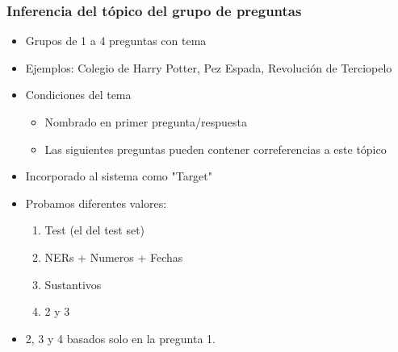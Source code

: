 \begin{frame}
\frametitle{Inferencia del tópico del grupo de preguntas}
  \begin{itemize}
    \item Grupos de 1 a 4 preguntas con tema
    \item Ejemplos: Colegio de Harry Potter, Pez Espada, Revolución de Terciopelo
    \item Condiciones del tema
    \begin{itemize}
      \item Nombrado en primer pregunta/respuesta
      \item Las siguientes preguntas pueden contener correferencias a este tópico
    \end{itemize}
    \item Incorporado al sistema como "Target"
    \item Probamos diferentes valores:
    \begin{enumerate}
      \item Test (el del test set)
      \item NERs + Numeros + Fechas
      \item Sustantivos
      \item 2 y 3
    \end{enumerate}
    \item 2, 3 y 4 basados solo en la pregunta 1.
  \end{itemize}
\end{frame}

